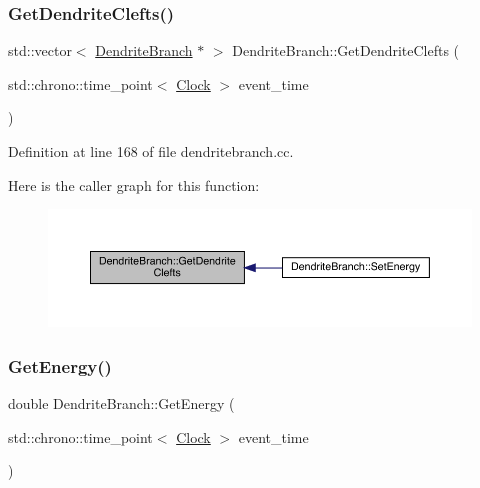 \subsubsection{\texorpdfstring{Get\+Dendrite\+Clefts()}{GetDendriteClefts()}}
{\footnotesize\ttfamily std\+::vector$<$ \hyperlink{class_dendrite_branch}{Dendrite\+Branch} $\ast$ $>$ Dendrite\+Branch\+::\+Get\+Dendrite\+Clefts (\begin{DoxyParamCaption}\item[{std\+::chrono\+::time\+\_\+point$<$ \hyperlink{universe_8h_a0ef8d951d1ca5ab3cfaf7ab4c7a6fd80}{Clock} $>$}]{event\+\_\+time }\end{DoxyParamCaption})}



Definition at line 168 of file dendritebranch.\+cc.

Here is the caller graph for this function\+:
\nopagebreak
\begin{figure}[H]
\begin{center}
\leavevmode
\includegraphics[width=350pt]{class_dendrite_branch_a2be44a81b4b5213947e9545400a0453c_icgraph}
\end{center}
\end{figure}
\mbox{\label{class_dendrite_branch_afab2dd907fba115c3483cd9a217ccec0}} 
\subsubsection{\texorpdfstring{Get\+Energy()}{GetEnergy()}}
{\footnotesize\ttfamily double Dendrite\+Branch\+::\+Get\+Energy (\begin{DoxyParamCaption}\item[{std\+::chrono\+::time\+\_\+point$<$ \hyperlink{universe_8h_a0ef8d951d1ca5ab3cfaf7ab4c7a6fd80}{Clock} $>$}]{event\+\_\+time }\end{DoxyParamCaption})\hspace{0.3cm}{\ttfamily [inline]}}



